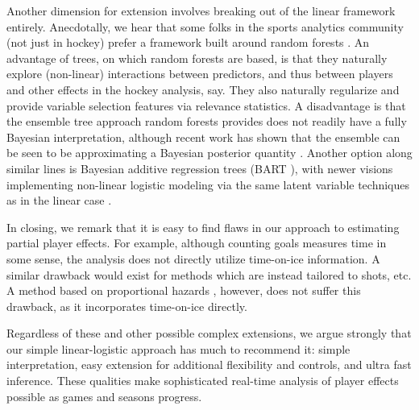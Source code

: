 Another dimension for extension involves breaking out of the linear framework
entirely.  Anecdotally, we hear that some folks in the sports analytics
community (not just in hockey) prefer a framework built around random forests
\cite{breiman:2001}.  An advantage of trees, on which random forests are based,
is that they naturally explore (non-linear) interactions between predictors,
and thus between players and other effects in the hockey analysis, say.  They
also naturally regularize and provide variable selection features via
relevance statistics. A disadvantage is that the ensemble tree approach random
forests provides does not readily have a fully Bayesian interpretation,
although recent work has shown that the ensemble can be seen to be
approximating a Bayesian posterior quantity \cite{taddy:eta:2015}.  Another
option along similar lines is Bayesian additive regression trees (BART
\cite{ChipGeorMcCu2010}), with newer visions implementing non-linear logistic
modeling via the same latent variable techniques as in the linear case
\cite{gra:pols:2012}.

In closing, we remark that it is easy to find flaws in our approach to
estimating partial player effects.  For example, although counting goals
measures time in some sense, the analysis does not directly utilize
time-on-ice information.  A similar drawback would exist for methods which are
instead tailored to shots, etc.  A method based on proportional hazards
\cite{ThoVenJen12}, however, does not suffer this drawback, as it incorporates
time-on-ice directly.  

Regardless of these and other possible complex extensions, we argue strongly
that our simple linear-logistic approach has much to recommend it: simple
interpretation, easy extension for additional flexibility and controls, and
ultra fast inference.  These qualities make sophisticated real-time analysis
of player effects possible as games and seasons progress.


